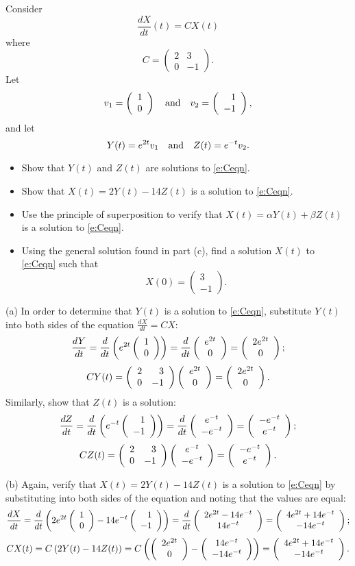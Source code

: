 \documentclass{ximera}
\begin{document}
\begin{exercise} \label{c4.5.1}
Consider
\begin{equation}  \label{e:Ceqn}
\frac{dX}{dt}(t) = CX(t)
\end{equation}
where
\[
C=\left(\begin{array}{cr} 2 & 3\\0& -1 \end{array}\right).
\]
Let
\[
v_1=\left(\begin{array}{c} 1\\0\end{array}\right)\quad\mbox{and}\quad
v_2=\left(\begin{array}{r} 1\\-1\end{array}\right),
\]
and let
\[
Y(t)=e^{2t} v_1 \quad\mbox{and}\quad Z(t)=e^{-t}v_2.
\]
\begin{itemize}
\item[(a)] Show that $Y(t)$ and $Z(t)$ are solutions to \eqref{e:Ceqn}.
\item[(b)] Show that $X(t)=2Y(t)-14Z(t)$ is a solution to \eqref{e:Ceqn}.
\item[(c)] Use the principle of superposition to verify that
$X(t)=\alpha Y(t) + \beta Z(t)$ is a solution to \eqref{e:Ceqn}.
\item[(d)] Using the general solution found in part (c), find a solution
$X(t)$ to \eqref{e:Ceqn} such that
\[
X(0) = \left(\begin{array}{r} 3\\-1\end{array}\right).
\]
\end{itemize}

\begin{solution}

(a) In order to determine that $Y(t)$ is a solution
to \eqref{e:Ceqn}, substitute $Y(t)$ into both sides of the 
equation $\frac{dX}{dt} = CX$:
\[
\frac{dY}{dt}
= \frac{d}{dt}\left(e^{2t}\left(\begin{array}{r} 1 \\ 0\end{array}\right)\right)
= \frac{d}{dt}\left(\begin{array}{c} e^{2t} \\ 0\end{array}\right)
= \left(\begin{array}{c} 2e^{2t} \\ 0\end{array}\right);
\]
\[
CY(t)
= \left(\begin{array}{rr} 2 & 3\\ 0 &-1\end{array}\right)\left(\begin{array}{c} e^{2t} \\ 0\end{array}\right)
= \left(\begin{array}{c} 2e^{2t} \\ 0\end{array}\right).
\]
Similarly, show that $Z(t)$ is a solution:
\[
\frac{dZ}{dt}
= \frac{d}{dt}\left(e^{-t}\left(\begin{array}{r} 1 \\ -1\end{array}\right)\right)
= \frac{d}{dt}\left(\begin{array}{c} e^{-t} \\ -e^{-t}\end{array}\right)
= \left(\begin{array}{c} -e^{-t} \\ e^{-t}\end{array}\right);
\]
\[
CZ(t)
= \left(\begin{array}{rr} 2 & 3\\ 0 &-1\end{array}\right)\left(\begin{array}{c} e^{-t} \\ -e^{-t}\end{array}\right)
= \left(\begin{array}{c} -e^{-t} \\ e^{-t}\end{array}\right).
\]

(b) Again, verify that $X(t) = 2Y(t) - 14Z(t)$ is a solution to
\eqref{e:Ceqn} by substituting into both sides of the equation and
noting that the values are equal:
\[
\frac{dX}{dt}
= \frac{d}{dt}\left(2e^{2t}\left(\begin{array}{r} 1 \\ 0\end{array}\right) - 14e^{-t}\left(\begin{array}{r} 1 \\ -1\end{array}\right)\right)
= \frac{d}{dt}\left(\begin{array}{c} 2e^{2t} - 14e^{-t} \\ 14e^{-t}\end{array}\right) 
= \left(\begin{array}{c} 4e^{2t} + 14e^{-t} \\ -14e^{-t}\end{array}\right);
\]
\[
CX(t) = C\left(2Y(t) - 14Z(t)\right)
= C\left(\left(\begin{array}{c} 2e^{2t} \\ 0\end{array}\right) - \left(\begin{array}{c} 14e^{-t} \\ -14e^{-t}\end{array}\right)\right)
= \left(\begin{array}{c} 4e^{2t} + 14e^{-t} \\ -14e^{-t}\end{array}\right).
\]


\end{solution}
\end{exercise}
\end{document}
